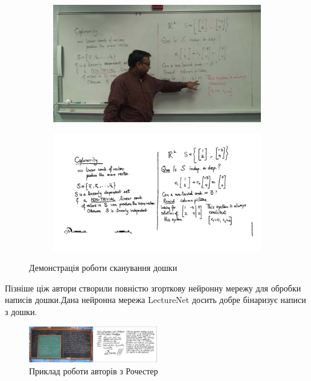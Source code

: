 \begin{figure}[h]
  \centering
  \begin{subfigure}[b]{0.3\textwidth}
    \centering
    \includegraphics[width=\textwidth]{images/davila_2017_1}
  \end{subfigure}
  \begin{subfigure}[b]{0.3\textwidth}
    \centering
    \includegraphics[width=\textwidth]{images/davila_2017_2}
  \end{subfigure}
  \label{fig:davila:2017}
  \caption{Демонстрація роботи сканування дошки}
\end{figure}

Пізніше ціж автори створили повністю згорткову нейронну мережу \cite{davila:2021}
для обробки написів дошки.Дана нейронна мережа LectureNet досить добре бінаризує написи з дошки.

\begin{figure}[h]
  \centering
  \includegraphics[width=0.5\textwidth]{images/davila_2021}
  \caption{Приклад роботи авторів з Рочестер}
  \label{fig:davila:2021}
\end{figure}


